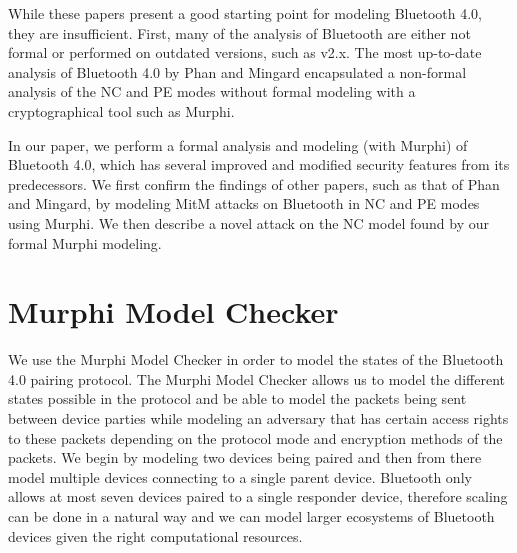 \documentclass{acm_proc_article-sp}
\begin{document}
While these papers present a good starting point for modeling Bluetooth 4.0, they are insufficient. First, many of the analysis of Bluetooth are either not formal or performed on outdated versions, such as v2.x. The most up-to-date analysis of Bluetooth 4.0 by Phan and Mingard encapsulated a non-formal analysis of the NC and PE modes without formal modeling with a cryptographical tool such as Murphi.

In our paper, we perform a formal analysis and modeling (with Murphi) of Bluetooth 4.0, which has several improved and modified security features from its predecessors. We first confirm the findings of other papers, such as that of Phan and Mingard, by modeling MitM attacks on Bluetooth in NC and PE modes using Murphi. We then describe a novel attack on the NC model found by our formal Murphi modeling.

\section{Murphi Model Checker}
We use the Murphi Model Checker in order to model the states of the Bluetooth 4.0 pairing protocol. The Murphi Model Checker allows us to model the different states possible in the protocol and be able to model the packets being sent between device parties while modeling an adversary that has certain access rights to these packets depending on the protocol mode and encryption methods of the packets. We begin by modeling two devices being paired and then from there model multiple devices connecting to a single parent device. Bluetooth only allows at most seven devices paired to a single responder device, therefore scaling can be done in a natural way and we can model larger ecosystems of Bluetooth devices given the right computational resources.
\end{document}
